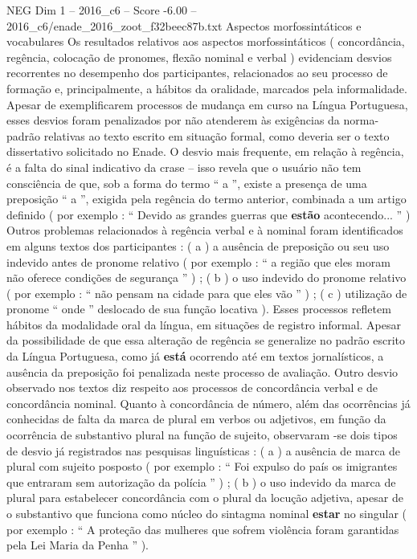 \begin{textsample}{NEG Dim 1 – 2016\_c6 – Score -6.00 – 2016\_c6/enade\_2016\_zoot\_f32beec87b.txt}
Aspectos morfossintáticos e vocabulares Os resultados relativos aos aspectos morfossintáticos ( concordância, regência, colocação de pronomes, flexão nominal e verbal ) evidenciam desvios recorrentes no desempenho dos participantes, relacionados ao seu processo de formação e, principalmente, a hábitos da oralidade, marcados pela informalidade.
Apesar de exemplificarem processos de mudança em curso na Língua Portuguesa, esses desvios foram penalizados por não atenderem às exigências da norma-padrão relativas ao texto escrito em situação formal, como deveria ser o texto dissertativo solicitado no Enade.
O desvio mais frequente, em relação à regência, é a falta do sinal indicativo da crase – isso revela que o usuário não tem consciência de que, sob a forma do termo “ a ”, existe a presença de uma preposição “ a ”, exigida pela regência do termo anterior, combinada a um artigo definido ( por exemplo : “ Devido as grandes guerras que \textbf{estão} acontecendo... ” ) Outros problemas relacionados à regência verbal e à nominal foram identificados em alguns textos dos participantes : ( a ) a ausência de preposição ou seu uso indevido antes de pronome relativo ( por exemplo : “ a região que eles moram não oferece condições de segurança ” ) ; ( b ) o uso indevido do pronome relativo ( por exemplo : “ não pensam na cidade para que eles vão ” ) ; ( c ) utilização de pronome “ onde ” deslocado de sua função locativa ).
Esses processos refletem hábitos da modalidade oral da língua, em situações de registro informal.
Apesar da possibilidade de que essa alteração de regência se generalize no padrão escrito da Língua Portuguesa, como já \textbf{está} ocorrendo até em textos jornalísticos, a ausência da preposição foi penalizada neste processo de avaliação.
Outro desvio observado nos textos diz respeito aos processos de concordância verbal e de concordância nominal.
Quanto à concordância de número, além das ocorrências já conhecidas de falta da marca de plural em verbos ou adjetivos, em função da ocorrência de substantivo plural na função de sujeito, observaram -se dois tipos de desvio já registrados nas pesquisas linguísticas : ( a ) a ausência de marca de plural com sujeito posposto ( por exemplo : “ Foi expulso do país os imigrantes que entraram sem autorização da polícia ” ) ; ( b ) o uso indevido da marca de plural para estabelecer concordância com o plural da locução adjetiva, apesar de o substantivo que funciona como núcleo do sintagma nominal \textbf{estar} no singular ( por exemplo : “ A proteção das mulheres que sofrem violência foram garantidas pela Lei Maria da Penha ” ).

\end{textsample}
